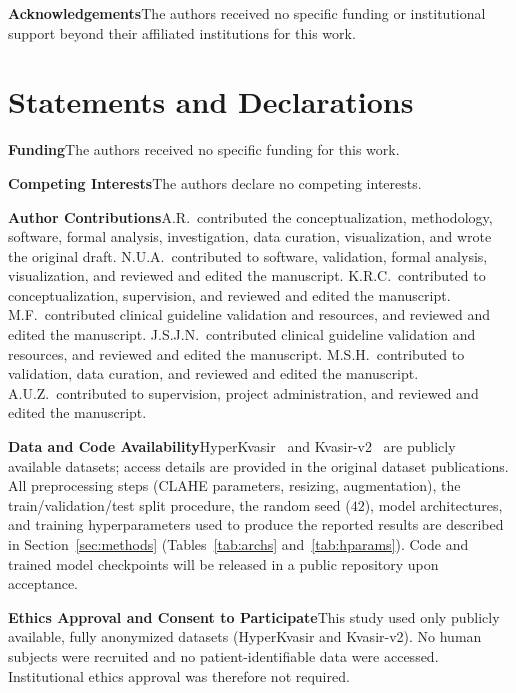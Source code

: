 \documentclass[11pt,a4paper]{article}
\begin{document}
\noindent\textbf{Acknowledgements}\quad The authors received no specific
funding or institutional support beyond their affiliated institutions for
this work.

\section*{Statements and Declarations}

\noindent\textbf{Funding}\quad The authors received no specific funding
for this work.

\noindent\textbf{Competing Interests}\quad The authors declare no
competing interests.

\noindent\textbf{Author Contributions}\quad A.R.\ contributed the
conceptualization, methodology, software, formal analysis, investigation,
data curation, visualization, and wrote the original draft. N.U.A.\
contributed to software, validation, formal analysis, visualization, and
reviewed and edited the manuscript. K.R.C.\ contributed to
conceptualization, supervision, and reviewed and edited the manuscript.
M.F.\ contributed clinical guideline validation and resources, and
reviewed and edited the manuscript. J.S.J.N.\ contributed clinical
guideline validation and resources, and reviewed and edited the
manuscript. M.S.H.\ contributed to validation, data curation, and
reviewed and edited the manuscript. A.U.Z.\ contributed to supervision,
project administration, and reviewed and edited the manuscript.

\noindent\textbf{Data and Code Availability}\quad HyperKvasir~\citep{Borgli2020}
and Kvasir-v2~\citep{Pogorelov2017b} are publicly available datasets;
access details are provided in the original dataset publications. All
preprocessing steps (CLAHE parameters, resizing, augmentation), the
train/validation/test split procedure, the random seed ($42$), model
architectures, and training hyperparameters used to produce the reported
results are described in Section~\ref{sec:methods}
(Tables~\ref{tab:archs} and~\ref{tab:hparams}). Code and trained model
checkpoints will be released in a public repository upon acceptance.

\noindent\textbf{Ethics Approval and Consent to Participate}\quad This
study used only publicly available, fully anonymized datasets (HyperKvasir
and Kvasir-v2). No human subjects were recruited and no patient-identifiable
data were accessed. Institutional ethics approval was therefore not
required.
\end{document}
